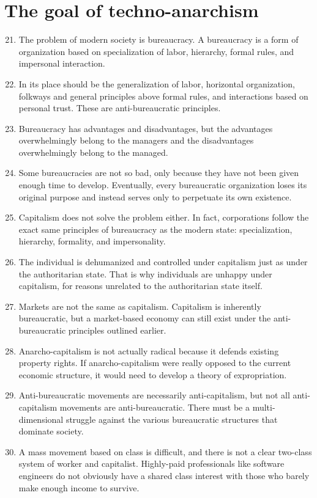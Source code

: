 \documentclass{article}
\begin{document}
\section{The goal of techno-anarchism}
\begin{enumerate}
\setcounter{enumi}{20}
\item The problem of modern society is bureaucracy. A bureaucracy is a form of organization based on specialization of labor, hierarchy, formal rules, and impersonal interaction.
\item In its place should be the generalization of labor, horizontal organization, folkways and general principles above formal rules, and interactions based on personal trust. These are anti-bureaucratic principles.
\item Bureaucracy has advantages and disadvantages, but the advantages overwhelmingly belong to the managers and the disadvantages overwhelmingly belong to the managed.
\item Some bureaucracies are not so bad, only because they have not been given enough time to develop. Eventually, every bureaucratic organization loses its original purpose and instead serves only to perpetuate its own existence.
\item Capitalism does not solve the problem either. In fact, corporations follow the exact same principles of bureaucracy as the modern state: specialization, hierarchy, formality, and impersonality.
\item The individual is dehumanized and controlled under capitalism just as under the authoritarian state. That is why individuals are unhappy under capitalism, for reasons unrelated to the authoritarian state itself.
\item Markets are not the same as capitalism. Capitalism is inherently bureaucratic, but a market-based economy can still exist under the anti-bureaucratic principles outlined earlier.
\item Anarcho-capitalism is not actually radical because it defends existing property rights. If anarcho-capitalism were really opposed to the current economic structure, it would need to develop a theory of expropriation.
\item Anti-bureaucratic movements are necessarily anti-capitalism, but not all anti-capitalism movements are anti-bureaucratic. There must be a multi-dimensional struggle against the various bureaucratic structures that dominate society.
\item A mass movement based on class is difficult, and there is not a clear two-class system of worker and capitalist. Highly-paid professionals like software engineers do not obviously have a shared class interest with those who barely make enough income to survive.

\end{enumerate}
\end{document}
